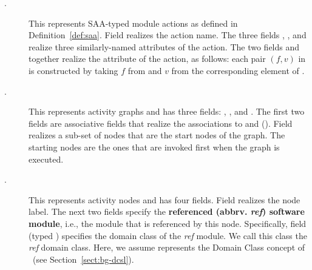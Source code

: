 \begin{description}
\item[.] This represents SAA-typed module actions as defined in Definition~\ref{def:saa}. Field  realizes the action name. The three fields , , and  realize three similarly-named attributes of the action.
%
The two fields  and    together realize the attribute  of the action, as follows: each pair $ (f,v) $ in  is constructed by taking $f$ from  and $v$ from the corresponding element of .
%
\item[.] This represents activity graphs and has three fields: , , and . The first two fields are associative fields that realize the associations to  and  (\resp). Field  realizes a sub-set of nodes that are the start nodes of the graph. The starting nodes are the ones that are invoked first when the graph is executed.
%
\item[.] This represents activity nodes and has four fields. Field  realizes the node label. 
The next two fields specify the \textbf{referenced (abbrv. \textit{ref}) software module}, i.e., the module that is referenced by this node. Specifically, field  (typed ) specifies the domain class of the \textit{ref} module. We call this class the \textit{ref} domain class. Here, we assume  represents the Domain Class concept of \dcsl~(see Section~\ref{sect:bg-dcsl}).


\end{description}
